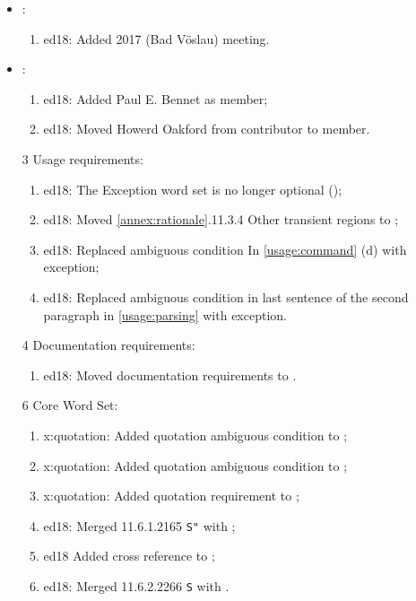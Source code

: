 	\begin{itemize}
	\item {}:						%
	\begin{enumerate}
		\item \textsf{ed18}: Added 2017 (Bad V\"oslau) meeting.
	\end{enumerate}

	\item {}:					%
	\begin{enumerate}
		\item \textsf{ed18}: Added Paul E. Bennet as member;
		\item \textsf{ed18}: Moved Howerd Oakford from contributor to member.
	\end{enumerate}
	
	\item[3] Usage requirements:				%
	\begin{enumerate}
		\item \textsf{ed18}: The Exception word set is no longer optional ();
		\item \textsf{ed18}: Moved \ref{annex:rationale}.11.3.4 Other transient regions to ;
		\item \textsf{ed18}: Replaced ambiguous condition In \ref{usage:command} (d)
			with exception;
		\item \textsf{ed18}: Replaced ambiguous condition in last sentence of the second
			paragraph in \ref{usage:parsing} with exception.
	\end{enumerate}
	
	\item[4] Documentation requirements:	%
	\begin{enumerate}
		\item \textsf{ed18}: Moved  documentation requirements to .
	\end{enumerate}
	
	\item[6] Core Word Set:					%
	\begin{enumerate}
		\item \textsf{x:quotation}: Added quotation ambiguous condition to ;
		\item \textsf{x:quotation}: Added quotation ambiguous condition to ;
		\item \textsf{x:quotation}: Added quotation requirement to ;
		\item \textsf{ed18}: Merged 11.6.1.2165 \texttt{S"} with ;
		\item \textsf{ed18} Added cross reference to ;
		\item \textsf{ed18}: Merged 11.6.2.2266 \texttt{S} with .
	\end{enumerate}
	

\end{itemize}
